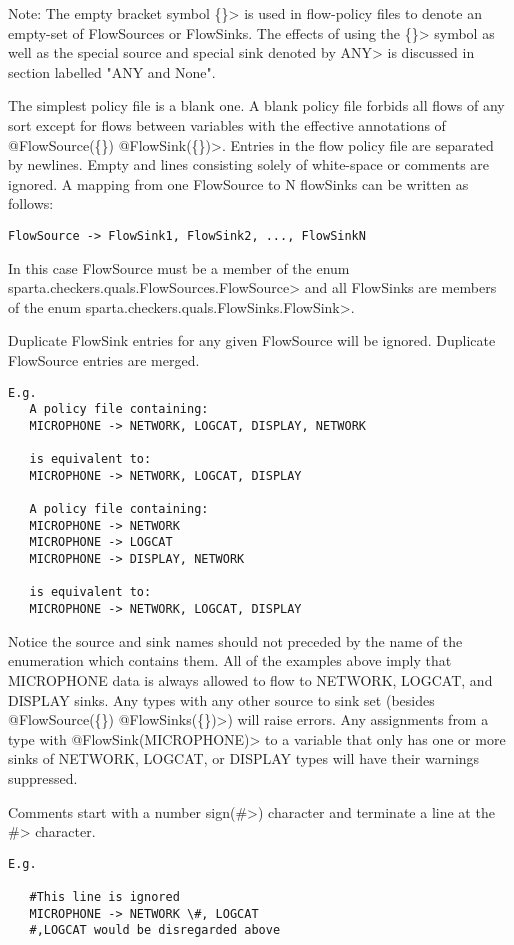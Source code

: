 Note:  The empty bracket symbol \<\{\}> is used in flow-policy
files to denote an empty-set of FlowSources or FlowSinks.
The effects of using the \<\{\}> symbol  as well as the special
source and special sink denoted by \<ANY> is discussed in
section labelled "ANY and None".

The simplest policy file is a blank one.  A blank policy file
forbids all flows of any sort except for flows between
variables with the effective annotations of \<@FlowSource(\{\}) @FlowSink(\{\})>.
Entries in the flow policy file are separated by newlines.
Empty and lines consisting solely of white-space or comments are ignored.
A mapping from one FlowSource to N flowSinks can be written as follows:
\begin{Verbatim}
FlowSource -> FlowSink1, FlowSink2, ..., FlowSinkN
\end{Verbatim}

In this case FlowSource must be a member of the enum
\<sparta.checkers.quals.FlowSources.FlowSource> and all FlowSinks are
members of the enum \<sparta.checkers.quals.FlowSinks.FlowSink>.

Duplicate FlowSink entries for any given FlowSource will be ignored.
Duplicate FlowSource entries are merged.

\begin{Verbatim}
E.g.
   A policy file containing:
   MICROPHONE -> NETWORK, LOGCAT, DISPLAY, NETWORK

   is equivalent to:
   MICROPHONE -> NETWORK, LOGCAT, DISPLAY

   A policy file containing:
   MICROPHONE -> NETWORK
   MICROPHONE -> LOGCAT
   MICROPHONE -> DISPLAY, NETWORK

   is equivalent to:
   MICROPHONE -> NETWORK, LOGCAT, DISPLAY
\end{Verbatim}


Notice the source and sink names should not preceded by the name of the
enumeration which contains them. All of the examples above imply that
MICROPHONE data is always allowed to flow to NETWORK, LOGCAT, and DISPLAY sinks.
Any types with any other source to sink set (besides \<@FlowSource(\{\}) @FlowSinks(\{\})>)
will raise errors.  Any assignments from a type with \<@FlowSink({MICROPHONE})>
to a variable that only has one or more sinks of NETWORK, LOGCAT, or DISPLAY
types will have their warnings suppressed.

Comments start with a number sign(\<\#>) character and terminate a line at the \<\#> character.

\begin{Verbatim}
E.g.

   #This line is ignored
   MICROPHONE -> NETWORK \#, LOGCAT
   #,LOGCAT would be disregarded above
\end{Verbatim}

